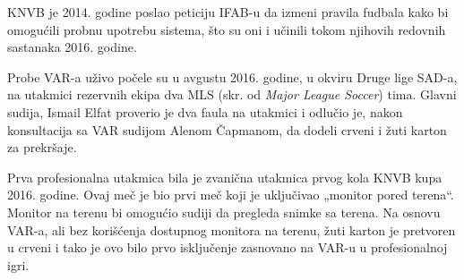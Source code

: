 \documentclass[a4paper]{article}
\begin{document}
KNVB je 2014. godine poslao peticiju IFAB-u da izmeni pravila fudbala kako bi omogućili probnu upotrebu sistema, što su oni i učinili tokom njihovih redovnih sastanaka 2016. godine.

Probe VAR-a uživo počele su u avgustu 2016. godine, u okviru Druge lige SAD-a, na utakmici rezervnih ekipa dva MLS (skr. od \emph{Major League Soccer}) tima. Glavni sudija, Ismail Elfat proverio je dva faula na utakmici i odlučio je, nakon konsultacija sa VAR sudijom Alenom Čapmanom, da dodeli crveni i žuti karton za prekršaje.

Prva profesionalna utakmica bila je zvanična utakmica prvog kola KNVB kupa 2016. godine. Ovaj meč je bio prvi meč koji je uključivao „monitor pored terena“. Monitor na terenu bi omogućio sudiji da pregleda snimke sa terena. Na osnovu VAR-a, ali bez korišćenja dostupnog monitora na terenu, žuti karton je pretvoren u crveni i tako je ovo bilo prvo isključenje zasnovano na VAR-u u profesionalnoj igri.
\end{document}
